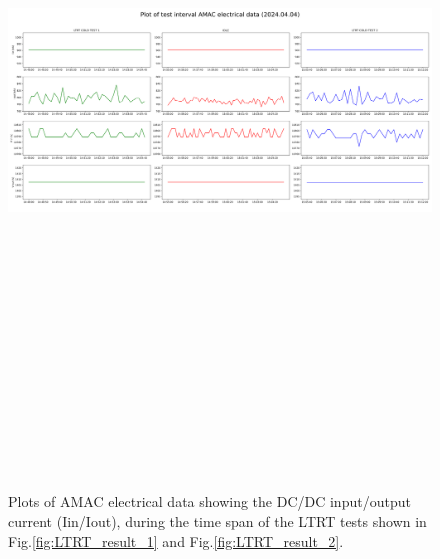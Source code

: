 \begin{figure}
    \centering
    \includegraphics[width=25cm,height=20cm,keepaspectratio]{Figures/results/amac_el_plot_20240404_.png}
    \caption{Plots of AMAC electrical data showing the DC/DC input/output current (Iin/Iout), during the time span of the LTRT tests shown in Fig.\ref{fig:LTRT_result_1} and Fig.\ref{fig:LTRT_result_2}.}
    \label{fig:amac_el_large}
\end{figure}

